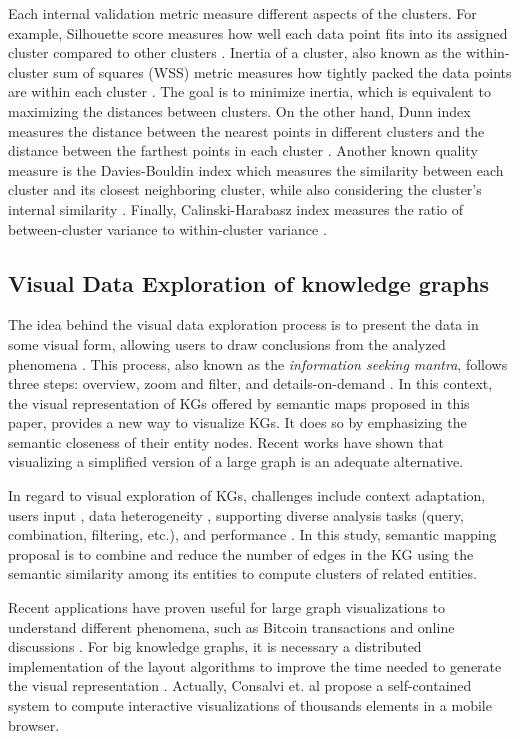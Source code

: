\documentclass{ieeeaccess}
\begin{document}
Each internal validation metric measure different aspects
of the clusters. For example, Silhouette score measures
how well each data point fits into its assigned cluster 
compared to other clusters \cite{kaufmanPAM}. Inertia of 
a cluster, also known as the within-cluster sum of squares
(WSS) metric measures how tightly packed the data points
are within each cluster \cite{McQueen67}. The goal is to
minimize inertia, 
which is equivalent to maximizing the distances between
clusters. On the other hand, Dunn index measures the distance between the nearest points in different clusters and the
distance between the farthest points in each cluster 
\cite{dunn1974well}. Another known quality measure is 
the Davies-Bouldin index which measures the similarity 
between each cluster and its closest neighboring cluster,
while also considering the cluster's internal similarity 
\cite{davies1979cluster}. Finally, Calinski-Harabasz 
index measures the ratio of between-cluster variance 
to within-cluster variance \cite{calinski1974dendrite}.

\subsection{Visual Data Exploration of knowledge graphs}

The idea behind the visual data exploration 
process is to present the data in some visual 
form, allowing users to draw conclusions from
the analyzed phenomena \cite{keim2001visual}. 
This process, also known as the \textit{information 
seeking mantra}, follows three steps: overview,
zoom and filter, and details-on-demand 
\cite{Shneiderman96}. In this context, the visual
representation of KGs offered by semantic maps 
proposed in this paper, provides a new way to 
visualize KGs. It does so by emphasizing the 
semantic closeness of their entity nodes. Recent
works \cite{6787141,1703364,8801911} have shown that
visualizing a simplified version of a large graph
is an adequate alternative.

In regard to visual exploration of KGs, challenges
include context adaptation, users input 
\cite{Koutra2019}, data heterogeneity
\cite{OntoVis,6787141,1703364}, supporting diverse 
analysis tasks (query, combination, filtering, etc.), 
and performance \cite{gomez2018visualizing}. In this
study, semantic mapping proposal is to combine and 
reduce the number of edges in the KG using the 
semantic similarity among its entities to compute 
clusters of related entities.

Recent applications have proven useful for large graph
visualizations to understand different phenomena, such
as Bitcoin transactions \cite{mcginn2016visualizing} 
and online discussions \cite{molina2017improving}. For
big knowledge graphs, it is necessary a distributed 
implementation of the layout algorithms to improve the 
time needed to generate the visual representation
\cite{gomez2018visualizing}. Actually, Consalvi et. al 
\cite{Consalvi2022} propose a self-contained system to 
compute interactive visualizations of thousands 
elements in a mobile browser.
\end{document}
